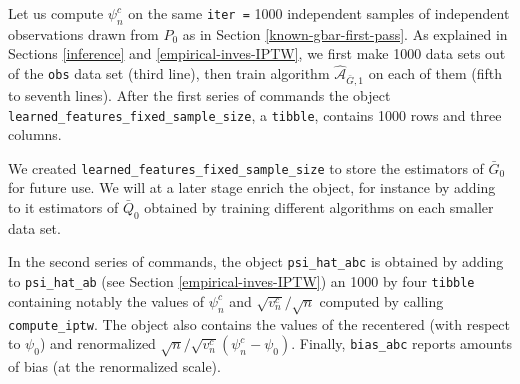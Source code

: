 \documentclass[
  11pt,
  openright,twoside]{book}
\newcommand{\Algo}{\widehat{\mathcal{A}}}
\newcommand{\Gbar}{\bar{G}}
\newcommand{\Qbar}{\bar{Q}}
\theoremstyle{definition}
\theoremstyle{definition}
\theoremstyle{definition}
\theoremstyle{definition}
\theoremstyle{remark}
\begin{document}
Let us compute \(\psi_{n}^{c}\) on the same \texttt{iter\ =} 1000 independent
samples of independent observations drawn from \(P_{0}\) as in Section
\ref{known-gbar-first-pass}. As explained in Sections \ref{inference} and
\ref{empirical-inves-IPTW}, we first make 1000 data sets out of the \texttt{obs}
data set (third line), then train algorithm \(\Algo_{\Gbar,1}\) on each of them
(fifth to seventh lines). After the first series of commands the object
\texttt{learned\_features\_fixed\_sample\_size}, a \texttt{tibble}, contains 1000 rows and
three columns.

We created \texttt{learned\_features\_fixed\_sample\_size} to store the estimators of
\(\Gbar_{0}\) for future use. We will at a later stage enrich the object, for
instance by adding to it estimators of \(\Qbar_{0}\) obtained by training
different algorithms on each smaller data set.

In the second series of commands, the object \texttt{psi\_hat\_abc} is obtained by
adding to \texttt{psi\_hat\_ab} (see Section \ref{empirical-inves-IPTW}) an 1000
by four \texttt{tibble} containing notably the values of \(\psi_{n}^{c}\) and
\(\sqrt{v_{n}^{c}}/\sqrt{n}\) computed by calling \texttt{compute\_iptw}. The object
also contains the values of the recentered (with respect to \(\psi_{0}\)) and
renormalized \(\sqrt{n}/\sqrt{v_{n}^{c}} (\psi_{n}^{c} - \psi_{0})\). Finally,
\texttt{bias\_abc} reports amounts of bias (at the renormalized scale).
\end{document}

